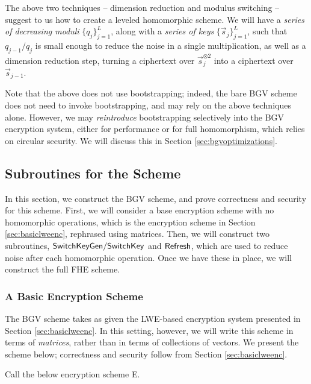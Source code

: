     The above two techniques -- dimension reduction and modulus switching -- suggest to us how to create a leveled homomorphic scheme. We will have a \emph{series of decreasing moduli} $\{q_j\}_{j = 1}^L$,  along with a \emph{series of keys} $\{\vec{s}_j\}_{j = 1}^L$, such that $q_{j - 1} / q_j$ is small enough to reduce the noise in a single multiplication, as well as a dimension reduction step, turning a ciphertext over $\vec{s}_j^{\otimes 2}$ into a ciphertext over $\vec{s}_{j-1}$.

    Note that the above does not use bootstrapping; indeed, the bare BGV scheme does not need to invoke bootstrapping, and may rely on the above techniques alone. However, we may \emph{reintroduce} bootstrapping selectively into the BGV encryption system, either for performance or for full homomorphism, which relies on circular security. We will discuss this in Section \ref{sec:bgvoptimizations}.

    \subsection{Subroutines for the Scheme} \label{sec:bgvconstruction}
    In this section, we construct the BGV scheme, and prove correctness and security for this scheme. First, we will consider a base encryption scheme with no homomorphic operations, which is the encryption scheme in Section \ref{sec:basiclweenc}, rephrased using matrices. Then, we will construct two subroutines, ${\sf SwitchKeyGen/SwitchKey}$ and ${\sf Refresh}$, which are used to reduce noise after each homomorphic operation. Once we have these in place, we will construct the full FHE scheme.

    \subsubsection{A Basic Encryption Scheme}
    The BGV scheme takes as given the LWE-based encryption system presented in Section \ref{sec:basiclweenc}. In this setting, however, we will write this scheme in terms of \emph{matrices}, rather than in terms of collections of vectors. We present the scheme below; correctness and security follow from Section \ref{sec:basiclweenc}.

    Call the below encryption scheme \textsf{E}.


